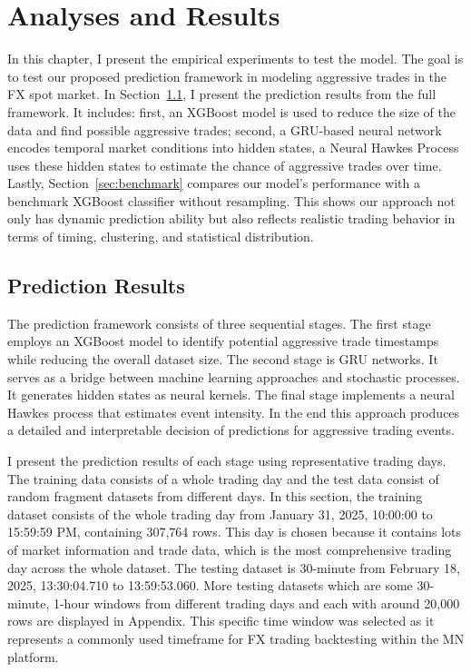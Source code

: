 \chapter{Analyses and Results}\label{chapter:experiments}
In this chapter, I present the empirical experiments to test the model. The goal is to test our proposed prediction framework in modeling aggressive trades in the FX spot market. In Section~\ref{sec:prediction}, I present the prediction results from the full framework. It includes: first, an XGBoost model is used to reduce the size of the data and find possible aggressive trades; second, a GRU-based neural network encodes temporal market conditions into hidden states, a Neural Hawkes Process uses these hidden states to estimate the chance of aggressive trades over time. Lastly, Section~\ref{sec:benchmark} compares our model's performance with a benchmark XGBoost classifier without resampling. This shows our approach not only has dynamic prediction ability but also reflects realistic trading behavior in terms of timing, clustering, and statistical distribution.


\section{Prediction Results} \label{sec:prediction}
The prediction framework consists of three sequential stages. The first stage employs an XGBoost model to identify potential aggressive trade timestamps while reducing the overall dataset size. The second stage is GRU networks. It serves as a bridge between machine learning approaches and stochastic processes. It generates hidden states as neural kernels. The final stage implements a neural Hawkes process that estimates event intensity. In the end this approach produces a detailed and interpretable decision of predictions for aggressive trading events.

I present the prediction results of each stage using representative trading days. The training data consists of a whole trading day and the test data consist of random fragment datasets from different days. In this section, the training dataset consists of the whole trading day from January 31, 2025, 10:00:00 to 15:59:59 PM, containing 307,764 rows. This day is chosen because it contains lots of market information and trade data, which is the most comprehensive trading day across the whole dataset. The testing dataset is 30-minute from February 18, 2025, 13:30:04.710 to 13:59:53.060. More testing datasets which are some 30-minute, 1-hour windows from different trading days and each with around 20,000 rows are displayed in Appendix. This specific time window was selected as it represents a commonly used timeframe for FX trading backtesting within the MN platform.

